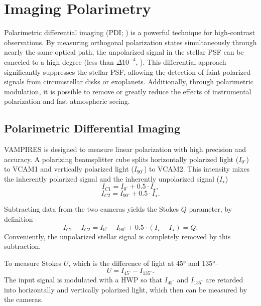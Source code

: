 \section{Imaging Polarimetry}\label{sec:polarimetry}

Polarimetric differential imaging (PDI; \citealp{kuhn_imaging_2001}) is a powerful technique for high-contrast observations. By measuring orthogonal polarization states simultaneously through nearly the same optical path, the unpolarized signal in the stellar PSF can be canceled to a high degree (less than $\Delta10^{-4}$, \citealp{schmid_spherezimpol_2018}). This differential approach significantly suppresses the stellar PSF, allowing the detection of faint polarized signals from circumstellar disks or exoplanets. Additionally, through polarimetric modulation, it is possible to remove or greatly reduce the effects of instrumental polarization and fast atmospheric seeing.
 
\subsection{Polarimetric Differential Imaging}

VAMPIRES is designed to measure linear polarization with high precision and accuracy. A polarizing beamsplitter cube splits horizontally polarized light ($I_{0^\circ}$) to VCAM1 and vertically polarized light ($I_{90^\circ}$) to VCAM2. This intensity mixes the inherently polarized signal and the inherently unpolarized signal ($I_\star$)
\begin{equation}
    I_{C1} = I_{0^\circ} + 0.5\cdot I_\star,
\end{equation}
\begin{equation}
    I_{C2} = I_{90^\circ} + 0.5\cdot I_\star.
\end{equation}

Subtracting data from the two cameras yields the Stokes $Q$ parameter, by definition--
\begin{equation}
    I_{C1} - I_{C2} = I_{0^\circ} - I_{90^\circ} + 0.5\cdot \left( I_\star - I_\star\right) = Q.
\end{equation}
Conveniently, the unpolarized stellar signal is completely removed by this subtraction.

To measure Stokes $U$, which is the difference of light at \ang{45} and \ang{135}--
\begin{equation}
    U = I_{45^\circ} - I_{135^\circ}.
\end{equation}
The input signal is modulated with a HWP so that $I_{45^\circ}$ and $I_{135^\circ}$ are retarded into horizontally and vertically polarized light, which then can be measured by the cameras.

